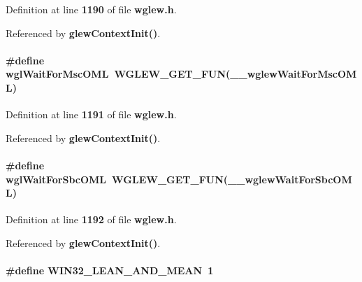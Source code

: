 Definition at line {\bf 1190} of file {\bf wglew.\+h}.



Referenced by {\bf glew\+Context\+Init()}.

\paragraph[{wgl\+Wait\+For\+Msc\+O\+ML}]{\setlength{\rightskip}{0pt plus 5cm}\#define wgl\+Wait\+For\+Msc\+O\+ML~{\bf W\+G\+L\+E\+W\+\_\+\+G\+E\+T\+\_\+\+F\+UN}({\bf \+\_\+\+\_\+wglew\+Wait\+For\+Msc\+O\+ML})}\label{wglew_8h_ae10cde31a2641ea1139487ad56573084}


Definition at line {\bf 1191} of file {\bf wglew.\+h}.



Referenced by {\bf glew\+Context\+Init()}.

\paragraph[{wgl\+Wait\+For\+Sbc\+O\+ML}]{\setlength{\rightskip}{0pt plus 5cm}\#define wgl\+Wait\+For\+Sbc\+O\+ML~{\bf W\+G\+L\+E\+W\+\_\+\+G\+E\+T\+\_\+\+F\+UN}({\bf \+\_\+\+\_\+wglew\+Wait\+For\+Sbc\+O\+ML})}\label{wglew_8h_ad0130e84e1957c8bcc9398bef46f05ba}


Definition at line {\bf 1192} of file {\bf wglew.\+h}.



Referenced by {\bf glew\+Context\+Init()}.

\paragraph[{W\+I\+N32\+\_\+\+L\+E\+A\+N\+\_\+\+A\+N\+D\+\_\+\+M\+E\+AN}]{\setlength{\rightskip}{0pt plus 5cm}\#define W\+I\+N32\+\_\+\+L\+E\+A\+N\+\_\+\+A\+N\+D\+\_\+\+M\+E\+AN~1}\label{wglew_8h_ac7bef5d85e3dcd73eef56ad39ffc84a9}


